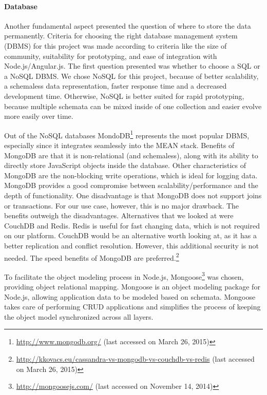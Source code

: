 	\paragraph{Database}

		Another fundamental aspect presented the question of where to store the data permanently. Criteria for choosing the right database management system (DBMS) for this project was made according to criteria like the size of community, suitability for prototyping, and ease of integration with Node.js/Angular.js. The first question presented was whether to choose a SQL or a NoSQL DBMS. We chose NoSQL for this project, because of better scalability, a schemaless data representation, faster response time and a decreased development time\cite{vaish2013getting}. Otherwise, NoSQL is better suited for rapid prototyping, because multiple schemata can be mixed inside of one collection and easier evolve more easily over time. 

		Out of the NoSQL databases MondoDB\footnote{\url{http://www.mongodb.org/} (last accessed on March 26, 2015)} represents the most popular DBMS, especially since it integrates seamlessly into the MEAN stack. Benefits of MongoDB are that it is non-relational (and schemaless), along with its ability to directly store JavaScript objects inside the database. Other characteristics of MongoDB are the non-blocking write operations, which is ideal for logging data. MongoDB provides a good compromise between scalability/performance and the depth of functionality. One disadvantage is that MongoDB does not support joins or transactions. For our use case, however, this is no major drawback. The benefits outweigh the disadvantages. Alternatives that we looked at were CouchDB and Redis. Redis is useful for fast changing data, which is not required on our platform. CouchDB would be an alternative worth looking at, as it has a better replication and conflict resolution. However, this additional security is not needed. The speed benefits of MongoDB are preferred.\footnote{\url{http://kkovacs.eu/cassandra-vs-mongodb-vs-couchdb-vs-redis} (last accessed on March 26, 2015)}
		
		To facilitate the object modeling process in Node.js, Mongoose\footnote{\url{http://mongoosejs.com/} (last accessed on November 14, 2014)} was chosen, providing object relational mapping. Mongoose is an object modeling package for Node.js, allowing application data to be modeled based on schemata. Mongoose takes care of performing CRUD applications and simplifies the process of keeping the object model synchronized across all layers.



